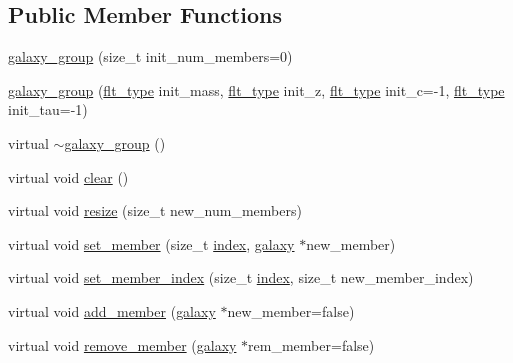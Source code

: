 \subsection*{Public Member Functions}
\begin{DoxyCompactItemize}
\item 
\hyperlink{classIceBRG_1_1galaxy__group_aca191f61edf00e2231ea9d1dc1920b7b}{galaxy\+\_\+group} (size\+\_\+t init\+\_\+num\+\_\+members=0)
\item 
\hyperlink{classIceBRG_1_1galaxy__group_af846959d0371506f4b5c250722094cdc}{galaxy\+\_\+group} (\hyperlink{lib_2IceBRG__main_2common_8h_ad0f130a56eeb944d9ef2692ee881ecc4}{flt\+\_\+type} init\+\_\+mass, \hyperlink{lib_2IceBRG__main_2common_8h_ad0f130a56eeb944d9ef2692ee881ecc4}{flt\+\_\+type} init\+\_\+z, \hyperlink{lib_2IceBRG__main_2common_8h_ad0f130a56eeb944d9ef2692ee881ecc4}{flt\+\_\+type} init\+\_\+c=-\/1, \hyperlink{lib_2IceBRG__main_2common_8h_ad0f130a56eeb944d9ef2692ee881ecc4}{flt\+\_\+type} init\+\_\+tau=-\/1)
\item 
virtual \hyperlink{classIceBRG_1_1galaxy__group_a6be6c53727fea15311b820d1fcb7909c}{$\sim$galaxy\+\_\+group} ()
\item 
virtual void \hyperlink{classIceBRG_1_1galaxy__group_af1be93cc734995c7fbfe6eb992094262}{clear} ()
\item 
virtual void \hyperlink{classIceBRG_1_1galaxy__group_a2e037901d1380a536dccf927611d68dc}{resize} (size\+\_\+t new\+\_\+num\+\_\+members)
\item 
virtual void \hyperlink{classIceBRG_1_1galaxy__group_aa34100e556ce7824e06e942b1141d9cc}{set\+\_\+member} (size\+\_\+t \hyperlink{classIceBRG_1_1sky__obj_ad25abf998cc346d25b085440509128bc}{index}, \hyperlink{classIceBRG_1_1galaxy}{galaxy} $\ast$new\+\_\+member)
\item 
virtual void \hyperlink{classIceBRG_1_1galaxy__group_a34987028c9a8b23f6c7e07b4e70de8e1}{set\+\_\+member\+\_\+index} (size\+\_\+t \hyperlink{classIceBRG_1_1sky__obj_ad25abf998cc346d25b085440509128bc}{index}, size\+\_\+t new\+\_\+member\+\_\+index)
\item 
virtual void \hyperlink{classIceBRG_1_1galaxy__group_a8bfb0e388047df1a783b59ef4b22a0d1}{add\+\_\+member} (\hyperlink{classIceBRG_1_1galaxy}{galaxy} $\ast$new\+\_\+member=false)
\item 
virtual void \hyperlink{classIceBRG_1_1galaxy__group_abc13746253a4e204604b533f7bdf2b0b}{remove\+\_\+member} (\hyperlink{classIceBRG_1_1galaxy}{galaxy} $\ast$rem\+\_\+member=false)
\item 

\end{DoxyCompactItemize}
